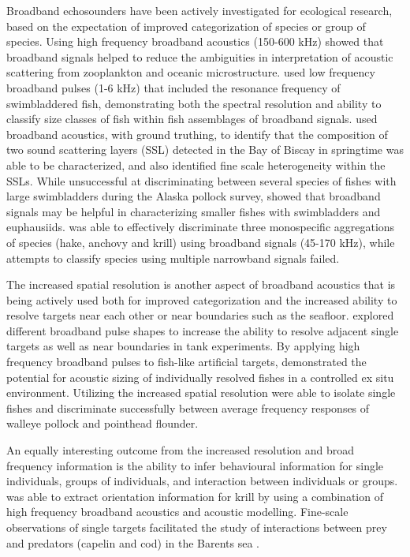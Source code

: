 \documentclass[preprint,12pt,TurnOnLineNumbers]{JASAnew}
\begin{document}
Broadband echosounders have been actively investigated for ecological research, based on the expectation of improved categorization of species or group of species. Using high frequency broadband acoustics (150-600 kHz) \citet{lavery_measurements_2010} showed that broadband signals helped to reduce the ambiguities in interpretation of acoustic scattering from zooplankton and oceanic microstructure. \citet{Stanton2012Resonance} used low frequency broadband pulses (1-6 kHz) that included the resonance frequency of swimbladdered fish, demonstrating both the spectral resolution and ability to classify size classes of fish within fish assemblages of broadband signals. \citet{blanluet_characterization_2019} used broadband acoustics, with ground truthing, to identify that the composition of two sound scattering layers (SSL) detected in the Bay of Biscay in springtime was able to be characterized, and also identified fine scale heterogeneity within the SSLs. While unsuccessful at discriminating between several species of fishes with large swimbladders during the Alaska pollock survey, \citet{bassett_broadband_2018} showed that broadband signals may be helpful in characterizing smaller fishes with swimbladders and euphausiids. \citet{benoit-bird_exploring_2020} was able to effectively discriminate three monospecific aggregations of species (hake, anchovy and krill) using broadband signals (45-170 kHz), while attempts to classify species using multiple narrowband signals failed.

The increased spatial resolution is another aspect of broadband acoustics that is being actively used both for improved categorization and the increased ability to resolve targets near each other or near boundaries such as the seafloor. \citet{lavery2017} explored different broadband pulse shapes to increase the ability to resolve adjacent single targets as well as near boundaries in tank experiments. By applying high frequency broadband pulses to fish-like artificial targets, \citet{kubilius_remote_2020} demonstrated the potential for acoustic sizing of individually resolved fishes in a controlled ex situ environment. Utilizing the increased spatial resolution \citet{hasegawa_situ_2021} were able to isolate single fishes and discriminate successfully between average frequency responses of walleye pollock and pointhead flounder.

An equally interesting outcome from the increased resolution and broad frequency information is the ability to infer behavioural information for single individuals, groups of individuals, and interaction between individuals or groups. \citet{Traykovski1998Effect} was able to extract orientation information for krill by using a combination of high frequency broadband acoustics and acoustic modelling. Fine-scale observations of single targets facilitated the study of interactions between prey and predators (capelin and cod) in the Barents sea \citep{skaret_diel_2020}.
\end{document}
